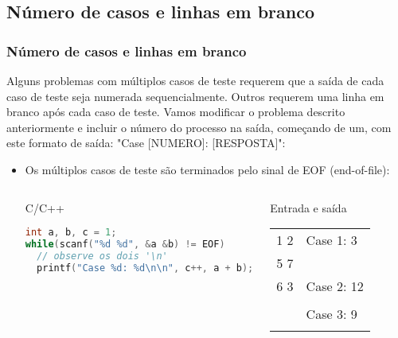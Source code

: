 \subsection{Número de casos e linhas em branco}

\begin{frame} [fragile]
  \frametitle{Número de casos e linhas em branco}
  {\small Alguns problemas com múltiplos casos de teste requerem que a saída de cada caso de teste seja numerada sequencialmente. Outros requerem uma linha em branco após cada caso de teste. Vamos modificar o problema descrito anteriormente e incluir o número do processo na saída, começando de um, com este formato de saída: "Case [NUMERO]: [RESPOSTA]":}
    \begin{itemize}
      \item {\small Os múltiplos casos de teste são terminados pelo sinal de EOF (end-of-file):}
      \begin{columns}
      \begin{block:ie}{C/C++}
	\begin{lstlisting}[language=c]
int a, b, c = 1;
while(scanf("%d %d", &a &b) != EOF)
  // observe os dois '\n'
  printf("Case %d: %d\n\n", c++, a + b);
	\end{lstlisting}
      \end{block:ie}

      \begin{block:ie}{Entrada e saída}  \tiny
	\begin{tabularx}{\textwidth}{|X|X|}
	  1 2&Case 1: 3\\5 7&\\6 3&Case 2: 12\\&\\&Case 3: 9\\&
	\end{tabularx}
      \end{block:ie}
    \end{columns}
  \end{itemize}
\end{frame}

